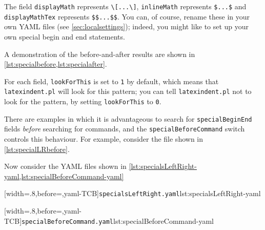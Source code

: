 	The field \texttt{displayMath} represents \lstinline!\[...\]!, \texttt{inlineMath} represents \lstinline!$...$! and \texttt{displayMathTex} represents \lstinline!$$...$$!.
	You can, of course, rename these in your own YAML files (see \vref{sec:localsettings}); indeed, you might like to set up your own special begin and end statements.

	A demonstration of the before-and-after results are shown in \cref{lst:specialbefore,lst:specialafter}.

	\begin{minipage}{.45\textwidth}
	\end{minipage}%
	\hfill
	\begin{minipage}{.45\textwidth}
	\end{minipage}

	For each field, \texttt{lookForThis} is set to \texttt{1} by default, which means that \texttt{latexindent.pl} will look for this pattern; you can tell \texttt{latexindent.pl} not to look for the pattern, by setting \texttt{lookForThis} to \texttt{0}.

	There are  examples in which it is advantageous to search for \texttt{specialBeginEnd} fields \emph{before} searching for commands, and the \texttt{specialBeforeCommand} switch controls this behaviour.
	For example, consider the file shown in \cref{lst:specialLRbefore}.


	Now consider the YAML files shown in \cref{lst:specialsLeftRight-yaml,lst:specialBeforeCommand-yaml} 

	\begin{minipage}{.49\linewidth}
		[width=.8\linewidth,before=\centering,yaml-TCB]{\texttt{specialsLeftRight.yaml}}{lst:specialsLeftRight-yaml}
	\end{minipage} \hfill
	\begin{minipage}{.49\linewidth}
		[width=.8\linewidth,before=\centering,yaml-TCB]{\texttt{specialBeforeCommand.yaml}}{lst:specialBeforeCommand-yaml}
	\end{minipage} 

